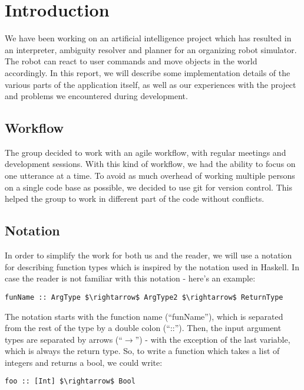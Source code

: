 \section*{Introduction}
We have been working on an artificial intelligence project which has resulted in an interpreter, ambiguity resolver and planner for an organizing robot simulator.
The robot can react to user commands and move objects in the world accordingly.
In this report, we will describe some implementation details of the various parts of the application itself, as well as our experiences with the project and problems we encountered during development.

\subsection*{Workflow}
The group decided to work with an agile workflow, with regular meetings and development sessions.
With this kind of workflow, we had the ability to focus on one utterance at a time.
To avoid as much overhead of working multiple persons on a single code base as possible, we decided to use git for version control.
This helped the group to work in different part of the code without conflicts.

\subsection*{Notation}
In order to simplify the work for both us and the reader, we will use a notation for describing function types which is inspired by the notation used in Haskell.
In case the reader is not familiar with this notation - here's an example:

\begin{lstlisting}
funName :: ArgType $\rightarrow$ ArgType2 $\rightarrow$ ReturnType
\end{lstlisting}

The notation starts with the function name (``funName''), which is separated from the rest of the type by a double colon (``::'').
Then, the input argument types are separated by arrows (``$\rightarrow$'') - with the exception of the last variable, which is always the return type.
So, to write a function which takes a list of integers and returns a bool, we could write:

\begin{lstlisting}
foo :: [Int] $\rightarrow$ Bool
\end{lstlisting}

